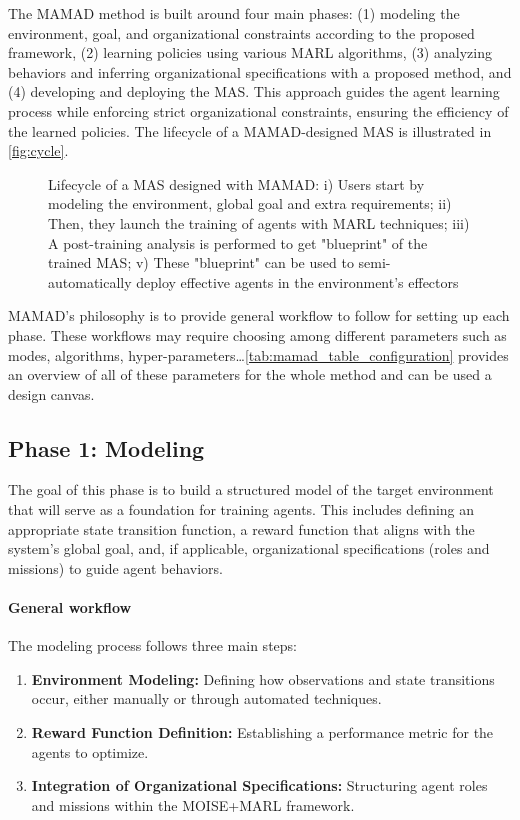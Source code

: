 \documentclass[pdflatex,sn-mathphys-num]{sn-jnl}%
\theoremstyle{thmstyleone}%
\theoremstyle{thmstyletwo}%
\theoremstyle{thmstylethree}%
\begin{document}
The MAMAD method is built around four main phases: (1) modeling the environment, goal, and organizational constraints according to the proposed framework, (2) learning policies using various MARL algorithms, (3) analyzing behaviors and inferring organizational specifications with a proposed method, and (4) developing and deploying the MAS. This approach guides the agent learning process while enforcing strict organizational constraints, ensuring the efficiency of the learned policies. The lifecycle of a MAMAD-designed MAS is illustrated in \autoref{fig:cycle}.



\begin{figure}[h!]
  \centering
  
  \caption{Lifecycle of a MAS designed with MAMAD: i) Users start by modeling the environment, global goal and extra requirements; \quad ii) Then, they launch the training of agents with MARL techniques; \quad iii) A post-training analysis is performed to get "blueprint" of the trained MAS; \quad v) These "blueprint" can be used to semi-automatically deploy effective agents in the environment's effectors}
  \label{fig:cycle}
\end{figure}

MAMAD's philosophy is to provide general workflow to follow for setting up each phase. These workflows may require choosing among different parameters such as modes, algorithms, hyper-parameters\dots \autoref{tab:mamad_table_configuration} provides an overview of all of these parameters for the whole method and can be used a design canvas.



\subsection{Phase 1: Modeling}

The goal of this phase is to build a structured model of the target environment that will serve as a foundation for training agents. This includes defining an appropriate state transition function, a reward function that aligns with the system's global goal, and, if applicable, organizational specifications (roles and missions) to guide agent behaviors.

\paragraph{\textbf{General workflow}}
The modeling process follows three main steps:
\begin{enumerate}
    \item \textbf{Environment Modeling:} Defining how observations and state transitions occur, either manually or through automated techniques.
    \item \textbf{Reward Function Definition:} Establishing a performance metric for the agents to optimize.
    \item \textbf{Integration of Organizational Specifications:} Structuring agent roles and missions within the MOISE+MARL framework.
\end{enumerate}
\end{document}
